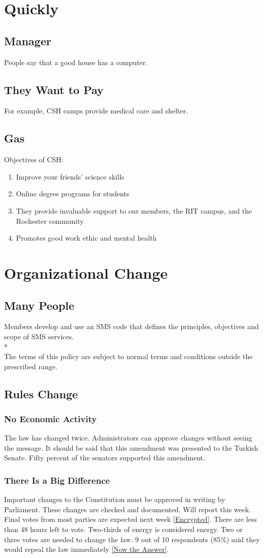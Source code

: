 \documentclass{article}
\newcommand{\article}[1]{\section{#1} \label{#1}}
\newcommand{\asection}[1]{\subsection{#1} \label{#1}}
\newcommand{\asubsection}[1]{\subsubsection{#1} \label{#1}}
\begin{document}
\article{Quickly}

\asection{Manager}
People say that a good house has a computer.

\asection{They Want to Pay}
For example, CSH camps provide medical care and shelter.

\asection{Gas}
Objectives of CSH:
\begin{enumerate}
	\item Improve your friends' science skills
	\item Online degree programs for students
	\item They provide invaluable support to our members, the RIT campus, and the Rochester community
	\item Promotes good work ethic and mental health
\end{enumerate}

\article{Organizational Change}

\asection{Many People}
Members develop and use an SMS code that defines the principles, objectives and scope of SMS services.
\\*\\
The terms of this policy are subject to normal terms and conditions outside the prescribed range.

\subsection{Rules Change}
\asubsection{No Economic Activity}
The law has changed twice.
Administrators can approve changes without seeing the message.
It should be said that this amendment was presented to the Turkish Senate. Fifty percent of the senators supported this amendment.

\asubsection{There Is a Big Difference}
Important changes to the Constitution must be approved in writing by Parliament.
These changes are checked and documented. Will report this week.
Final votes from most parties are expected next week \ref{Encrypted}.
There are less than 48 hours left to vote.
Two-thirds of energy is considered energy.
Two or three votes are needed to change the law.
9 out of 10 respondents (85\%) said they would repeal the law immediately \ref{Now the Answer}.
\end{document}
